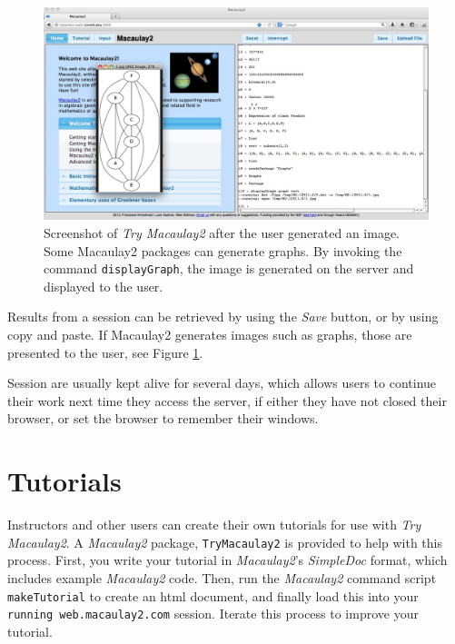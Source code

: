 \documentclass[]{article}
\def\tryM2{{\it Try Macaulay2}}
\def\M2{{\it Macaulay2}}
\begin{document}

\begin{figure}[htb]
    \includegraphics[width=.95\textwidth]{withGraph.jpg}
    \caption{Screenshot of \tryM2 after the user
      generated an image. Some Macaulay2 packages can generate
      graphs. By invoking the command {\tt displayGraph}, the image is
      generated on the server and displayed to the user.}
    \label{fig:graph}
\end{figure}

Results from a session can be retrieved by using the {\it Save}
button, or by using copy and paste. If Macaulay2 generates
images such as graphs, those are presented to the user, see Figure \ref{fig:graph}.


Session are usually kept alive for several days, which allows users to
continue their work next time they access the server, if either they
have not closed their browser, or set the browser to remember their
windows.

\section{Tutorials}
Instructors and other users can create their own tutorials for use with \tryM2.
A \M2 package, {\tt TryMacaulay2} is provided to help with this process.  
First, you write your tutorial in \M2's {\it SimpleDoc} format, which includes example \M2 code.
Then, run the \M2 command script {\tt makeTutorial} to create an html document, and finally 
load this into your {\tt running web.macaulay2.com} session.  Iterate this process
to improve your tutorial.
\end{document}
